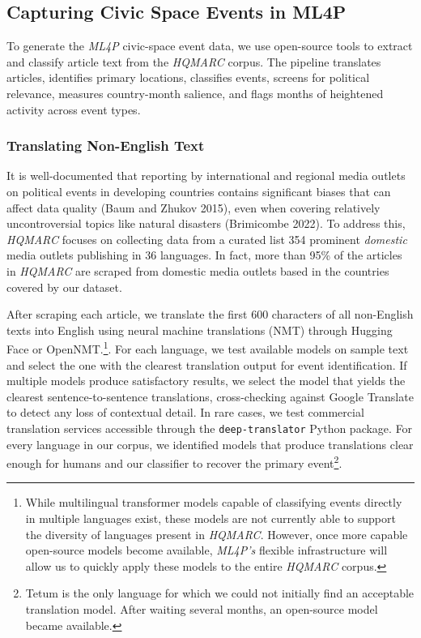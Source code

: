 \documentclass[
  letterpaper,
  DIV=11,
  numbers=noendperiod]{scrartcl}
\begin{document}
\hypertarget{capturing-civic-space-events-in-ml4p}{%
\subsection{Capturing Civic Space Events in
ML4P}\label{capturing-civic-space-events-in-ml4p}}

To generate the \emph{ML4P} civic-space event data, we use open-source
tools to extract and classify article text from the \emph{HQMARC}
corpus. The pipeline translates articles, identifies primary locations,
classifies events, screens for political relevance, measures
country-month salience, and flags months of heightened activity across
event types.

\hypertarget{translating-non-english-text}{%
\subsubsection{Translating Non-English
Text}\label{translating-non-english-text}}

It is well-documented that reporting by international and regional media
outlets on political events in developing countries contains significant
biases that can affect data quality (Baum and Zhukov 2015), even when
covering relatively uncontroversial topics like natural disasters
(Brimicombe 2022). To address this, \emph{HQMARC} focuses on collecting
data from a curated list 354 prominent \emph{domestic} media outlets
publishing in 36 languages. In fact, more than 95\% of the articles in
\emph{HQMARC} are scraped from domestic media outlets based in the
countries covered by our dataset.

After scraping each article, we translate the first 600 characters of
all non-English texts into English using neural machine translations
(NMT) through Hugging Face or OpenNMT.\footnote{While multilingual
  transformer models capable of classifying events directly in multiple
  languages exist, these models are not currently able to support the
  diversity of languages present in \emph{HQMARC}. However, once more
  capable open-source models become available, \emph{ML4P's} flexible
  infrastructure will allow us to quickly apply these models to the
  entire \emph{HQMARC} corpus.}. For each language, we test available
models on sample text and select the one with the clearest translation
output for event identification. If multiple models produce satisfactory
results, we select the model that yields the clearest
sentence-to-sentence translations, cross-checking against Google
Translate to detect any loss of contextual detail. In rare cases, we
test commercial translation services accessible through the
\texttt{deep-translator} Python package. For every language in our
corpus, we identified models that produce translations clear enough for
humans and our classifier to recover the primary event\footnote{Tetum is
  the only language for which we could not initially find an acceptable
  translation model. After waiting several months, an open-source model
  became available.}.
\end{document}
